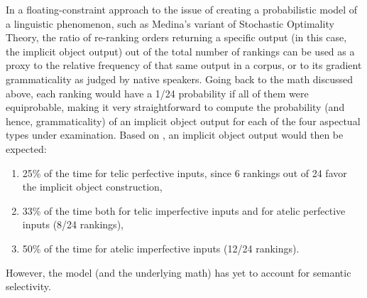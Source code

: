 In a floating-constraint approach to the issue of creating a probabilistic model of a linguistic phenomenon, such as Medina's variant of Stochastic Optimality Theory, the ratio of re-ranking orders returning a specific output (in this case, the implicit object output) out of the total number of rankings can be used as a proxy to the relative frequency of that same output in a corpus, or to its gradient grammaticality as judged by native speakers. Going back to the math discussed above, each ranking would have a 1/24 probability if all of them were equiprobable, making it very straightforward to compute the probability (and hence, grammaticality) of an implicit object output for each of the four aspectual types under examination. Based on , an implicit object output would then be expected:
\begin{enumerate}
    \item 25\% of the time for telic perfective inputs, since 6 rankings out of 24 favor the implicit object construction,
    \item 33\% of the time both for telic imperfective inputs and for atelic perfective inputs (8/24 rankings),
    \item 50\% of the time for atelic imperfective inputs (12/24 rankings).
\end{enumerate}

However, the model (and the underlying math) has yet to account for semantic selectivity.

